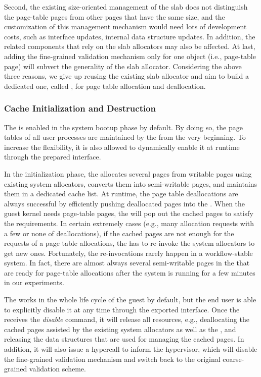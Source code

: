 Second, the existing size-oriented management of the slab does not distinguish the page-table pages from other pages that have the same size, and the customization of this management mechanism would need lots of development costs, such as interface updates, internal data structure updates.
In addition, the related components that rely on the slab allocators may also be affected.
At last, adding the fine-grained validation mechanism only for one object (i.e., page-table page) will subvert the generality of the slab allocator.
Considering the above three reasons, we give up reusing the existing slab allocator and aim to build a dedicated one, called \cache, for page table allocation and deallocation.

\subsubsection{\name Cache Initialization and Destruction}
The \cache is enabled in the system bootup phase by default.
By doing so, the page tables of all user processes are maintained by the \cache from the very beginning.
To increase the flexibility, it is also allowed to dynamically enable it at runtime through the prepared interface.

In the initialization phase, the \cache allocates several pages from writable pages using existing system allocators, converts them into semi-writable pages, and maintains them in a dedicated cache list.
At runtime, the page table deallocations are always successful by efficiently pushing deallocated pages into the \cache.
When the guest kernel needs page-table pages, the \cache  will pop out the cached pages to satisfy the requirements.
In certain extremely cases (e.g., many allocation requests with a few or none of deallocations), if the cached pages are not enough for the requests of a page table allocations, the \cache has to re-invoke the system allocators to get new ones.
Fortunately, the re-invocations rarely happen in a workflow-stable system.
In fact, there are almost always several semi-writable pages in the \cache that are ready for page-table allocations after the system is running for a few minutes in our experiments.

The \cache works in the whole life cycle of the guest by default, but the end  user is able to explicitly disable it at any time through the exported interface.
Once the \cache receives the \emph{disable} command, it will release all resources, e.g., deallocating the cached pages assisted by the existing system allocators as well as the \module, and releasing the data structures that are used for managing the cached pages. 
In addition, it will also issue a hypercall to inform the hypervisor, which will disable the fine-grained validation mechanism and switch back to the original coarse-grained validation scheme.

